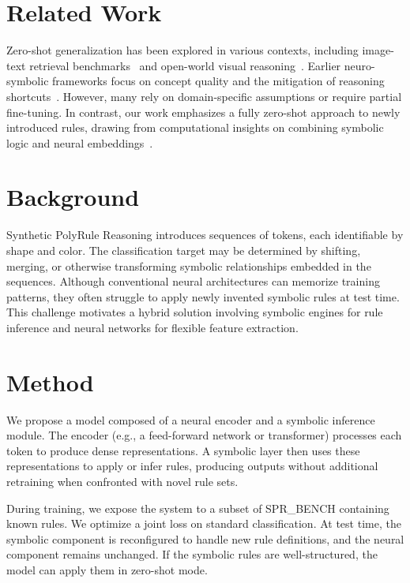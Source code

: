 \documentclass{article} %
\theoremstyle{plain}
\theoremstyle{definition}
\theoremstyle{remark}
\begin{document}
\section{Related Work}\label{sec:related}
Zero-shot generalization has been explored in various contexts, including image-text retrieval benchmarks~\citep{thakur2021beirah} and open-world visual reasoning~\citep{burghouts2024openworldvr}. Earlier neuro-symbolic frameworks focus on concept quality and the mitigation of reasoning shortcuts~\citep{bortolotti2024anb}. However, many rely on domain-specific assumptions or require partial fine-tuning. In contrast, our work emphasizes a fully zero-shot approach to newly introduced rules, drawing from computational insights on combining symbolic logic and neural embeddings~\citep{sir2024acp}.

\section{Background}\label{sec:background}
Synthetic PolyRule Reasoning introduces sequences of tokens, each identifiable by shape and color. The classification target may be determined by shifting, merging, or otherwise transforming symbolic relationships embedded in the sequences. Although conventional neural architectures can memorize training patterns, they often struggle to apply newly invented symbolic rules at test time. This challenge motivates a hybrid solution involving symbolic engines for rule inference and neural networks for flexible feature extraction.

\section{Method}\label{sec:method}
We propose a model composed of a neural encoder and a symbolic inference module. The encoder (e.g., a feed-forward network or transformer) processes each token to produce dense representations. A symbolic layer then uses these representations to apply or infer rules, producing outputs without additional retraining when confronted with novel rule sets.

During training, we expose the system to a subset of SPR\_BENCH containing known rules. We optimize a joint loss on standard classification. At test time, the symbolic component is reconfigured to handle new rule definitions, and the neural component remains unchanged. If the symbolic rules are well-structured, the model can apply them in zero-shot mode.
\end{document}
